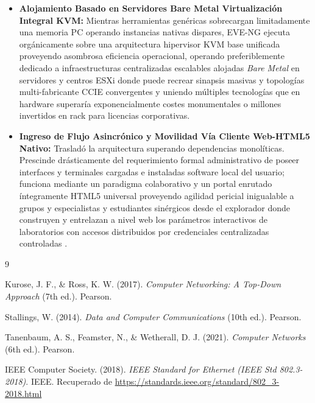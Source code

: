 \documentclass[a4paper,12pt]{article}
\begin{document}
\begin{itemize}
    \item \textbf{Alojamiento Basado en Servidores Bare Metal Virtualización Integral KVM:} Mientras herramientas genéricas sobrecargan limitadamente una memoria PC operando instancias nativas dispares, EVE-NG ejecuta orgánicamente sobre una arquitectura hipervisor KVM base unificada proveyendo asombrosa eficiencia operacional, operando preferiblemente dedicado a infraestructuras centralizadas escalables alojadas \textit{Bare Metal} en servidores y centros ESXi donde puede recrear sinapsis masivas y topologías multi-fabricante CCIE convergentes y uniendo múltiples tecnologías que en hardware superaría exponencialmente costes monumentales o millones invertidos en rack para licencias corporativas.
    \item \textbf{Ingreso de Flujo Asincrónico y Movilidad Vía Cliente Web-HTML5 Nativo:} Trasladó la arquitectura superando dependencias monolíticas. Prescinde drásticamente del requerimiento formal administrativo de poseer interfaces y terminales cargadas e instaladas software local del usuario; funciona mediante un paradigma colaborativo y un portal enrutado íntegramente HTML5 universal proveyendo agilidad pericial inigualable a grupos y especialistas y estudiantes sinérgicos desde el explorador donde construyen y entrelazan a nivel web los parámetros interactivos de laboratorios con accesos distribuidos por credenciales centralizadas controladas \cite{stallings2014}.
\end{itemize}


\begin{thebibliography}{9}
    
    Kurose, J. F., \& Ross, K. W. (2017). \textit{Computer Networking: A Top-Down Approach} (7th ed.). Pearson.

    Stallings, W. (2014). \textit{Data and Computer Communications} (10th ed.). Pearson.

    Tanenbaum, A. S., Feamster, N., \& Wetherall, D. J. (2021). \textit{Computer Networks} (6th ed.). Pearson.

    IEEE Computer Society. (2018). \textit{IEEE Standard for Ethernet (IEEE Std 802.3-2018)}. IEEE. Recuperado de \url{https://standards.ieee.org/standard/802_3-2018.html}

\end{thebibliography}
\end{document}
